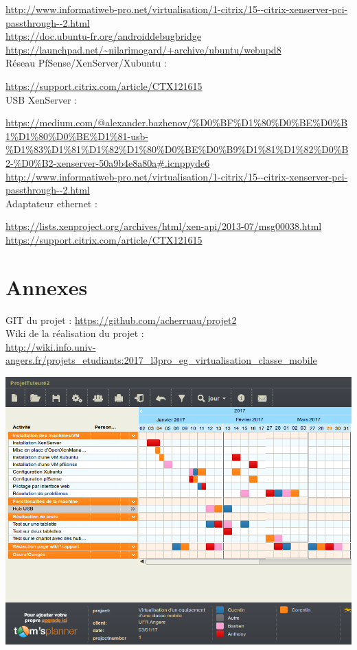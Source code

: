 \documentclass[a4paper,12pt]{extarticle}
\begin{document}
\url{http://www.informatiweb-pro.net/virtualisation/1-citrix/15--citrix-xenserver-pci-passthrough--2.html}\\
\url{https://doc.ubuntu-fr.org/androiddebugbridge}\\
\url{https://launchpad.net/~nilarimogard/+archive/ubuntu/webupd8}\\

Réseau PfSense/XenServer/Xubuntu :

\url{https://support.citrix.com/article/CTX121615}\\

USB XenServer :

\url{https://medium.com/@alexander.bazhenov/\%D0\%BF\%D1\%80\%D0\%BE\%D0\%B1\%D1\%80\%D0\%BE\%D1\%81-usb-\%D1\%83\%D1\%81\%D1\%82\%D1\%80\%D0\%BE\%D0\%B9\%D1\%81\%D1\%82\%D0\%B2-\%D0\%B2-xenserver-50a9b4e8a80a#.icnppyde6}\\
\url{http://www.informatiweb-pro.net/virtualisation/1-citrix/15--citrix-xenserver-pci-passthrough--2.html}\\

Adaptateur ethernet :

\url{https://lists.xenproject.org/archives/html/xen-api/2013-07/msg00038.html}\\
\url{https://support.citrix.com/article/CTX121615}\\

\clearpage

\section{Annexes}

GIT du projet :
\url{https://github.com/acherruau/projet2}\\

Wiki de la réalisation du projet :\\ 
\url{http://wiki.info.univ-angers.fr/projets_etudiants:2017_l3pro_eg_virtualisation_classe_mobile}\\

\begin{center}
\includegraphics[scale=0.6, angle=270]{Gantt4}
\end{center}
\end{document}
